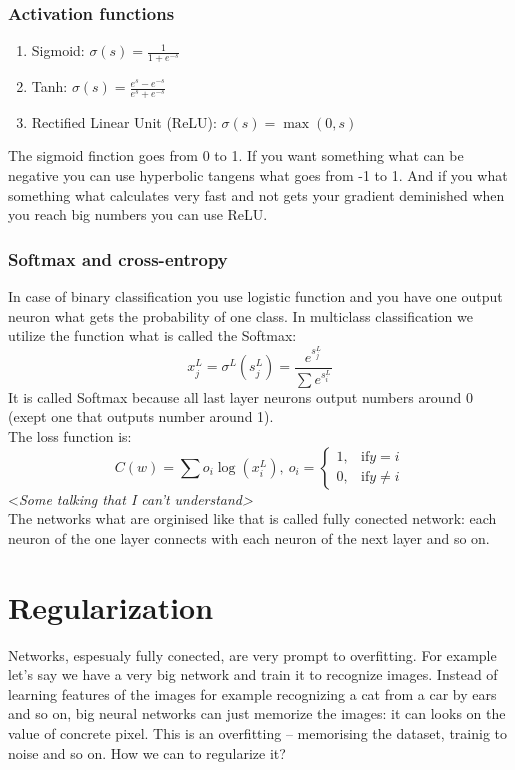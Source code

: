 \subsubsection*{Activation functions}

\begin{enumerate}[label=$\bullet$]
  \item Sigmoid: $\sigma(s)=\frac{1}{1+e^{-s}}$
  \item Tanh: $\sigma(s)=\frac{e^s-e^{-s}}{e^s+e^{-s}}$
  \item Rectified Linear Unit (ReLU): $\sigma(s)=\max(0,s)$
\end{enumerate}
The sigmoid finction goes from 0 to 1. If you want something what can be negative you can use hyperbolic tangens what goes from -1 to 1. And if you what something what calculates very fast and not gets your gradient deminished when you reach big numbers you can use ReLU.

\subsubsection*{Softmax and cross-entropy}

In case of binary classification you use logistic function and you have one output neuron what gets the probability of one class. In multiclass classification we utilize the function what is called the Softmax:
$$x_j^L=\sigma^L(s_j^L)=\frac{e^{s_j^L}}{\sum e^{s_i^L}}$$
It is called Softmax because all last layer neurons output numbers around 0 (exept one that outputs number around 1).\\
The loss function is:
$$C(w)=\sum o_i\log(x_i^L),\ o_i=\begin{cases}
1,&\text{if}y=i\\
0,&\text{if}y\ne i
\end{cases}$$
{<\it Some talking that I can't understand>}\\
The networks what are orginised like that is called fully conected network: each neuron of the one layer connects with each neuron of the next layer and so on.

\section{Regularization}

Networks, espesualy fully conected, are very prompt to overfitting. For example let's say we have a very big network and train it to recognize images. Instead of learning features of the images for example recognizing a cat from a car by ears and so on, big neural networks can just memorize the images: it can looks on the value of concrete pixel. This is an overfitting -- memorising the dataset, trainig to noise and so on. How we can to regularize it? 

